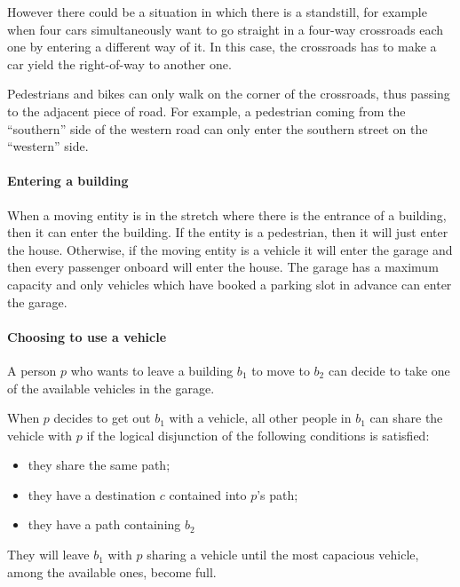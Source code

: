 However there could be a situation in which there is a standstill,
for example when four cars simultaneously want to go straight in
a four-way crossroads each one by entering a different way of it.
In this case, the crossroads has to make a car yield the right-of-way
to another one.

Pedestrians and bikes can only walk on the corner of the crossroads, thus
passing to the adjacent piece of road.
For example, a pedestrian coming from the ``southern'' side of the
western road can only enter the southern street on the ``western'' side.

\paragraph{Entering a building}
When a moving entity is in the stretch where there is the entrance of a
building, then it can enter the building. If the entity is a pedestrian, then
it will just enter the house.
Otherwise, if the moving entity is a vehicle it will
enter the garage and then every passenger onboard will enter the house.
The garage has a maximum capacity and only vehicles
which have booked a parking slot in advance can enter the garage.

\paragraph{Choosing to use a vehicle}
A person $p$ who wants to leave a building $b_1$ to move to $b_2$ can decide
to take one of the available vehicles in the garage.

When $p$ decides to get out $b_1$ with a vehicle,
all other people in $b_1$
can share the vehicle with $p$ if the logical disjunction
of the following conditions is satisfied:
\begin{itemize}
\item they share the same path;
\item they have a destination $c$ contained into $p$'s path;
\item they have a path containing $b_2$
\end{itemize}
They will leave $b_1$ with $p$ sharing a vehicle
until the most capacious vehicle, among the available ones, become full.

